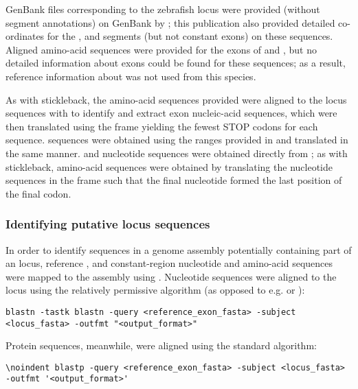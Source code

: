 
\noindent GenBank files corresponding to the zebrafish \igh{} locus were provided (without segment annotations) on GenBank by \parencite{danilova2005zebrafish}; this publication also provided detailed co-ordinates for the \vh, \dh and \jh segments (but not constant exons) on these sequences. Aligned amino-acid sequences were provided for the exons of  and , but no detailed information about  exons could be found for these sequences; as a result, reference information about  was not used from this species.

As with stickleback, the amino-acid sequences provided were aligned to the locus sequences  with  to identify and extract exon nucleic-acid sequences, which were then translated using the frame yielding the fewest STOP codons for each sequence. \vh sequences were obtained using the ranges provided in \parencite{danilova2005zebrafish} and translated in the same manner. \dh and \jh nucleotide sequences were obtained directly from \parencite{danilova2005zebrafish}; as with stickleback, \jh amino-acid sequences were obtained by translating the nucleotide sequences in the frame such that the final nucleotide formed the last position of the final codon.

\subsubsection{Identifying putative locus sequences}
\label{sec:methods_comp_locus_scaffolds}

In order to identify sequences in a genome assembly potentially containing part of an \igh{} locus, reference \vh, \jh and constant-region nucleotide and amino-acid sequences were mapped to the assembly using  \parencite{altschul1990blast,altschul1997blast}. Nucleotide sequences were aligned to the locus using the relatively permissive  algorithm (as opposed to e.g.  or ):

\begin{lstlisting}
blastn -tastk blastn -query <reference_exon_fasta> -subject <locus_fasta> -outfmt "<output_format>"
\end{lstlisting}

Protein sequences, meanwhile, were aligned using the standard  algorithm:

\begin{lstlisting}
\noindent blastp -query <reference_exon_fasta> -subject <locus_fasta> -outfmt '<output_format>'
\end{lstlisting}

